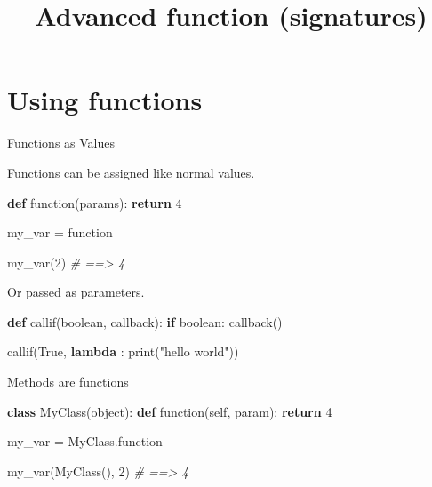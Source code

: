 \documentclass[ignorenonframetext,]{beamer}
\title{Advanced function (signatures)}
\date{}
\newenvironment{Shaded}{}{}
\newcommand{\KeywordTok}[1]{\textcolor[rgb]{0.00,0.44,0.13}{\textbf{{#1}}}}
\newcommand{\DataTypeTok}[1]{\textcolor[rgb]{0.56,0.13,0.00}{{#1}}}
\newcommand{\DecValTok}[1]{\textcolor[rgb]{0.25,0.63,0.44}{{#1}}}
\newcommand{\StringTok}[1]{\textcolor[rgb]{0.25,0.44,0.63}{{#1}}}
\newcommand{\CommentTok}[1]{\textcolor[rgb]{0.38,0.63,0.69}{\textit{{#1}}}}
\newcommand{\OtherTok}[1]{\textcolor[rgb]{0.00,0.44,0.13}{{#1}}}
\newcommand{\NormalTok}[1]{{#1}}
\begin{document}
\frame{\titlepage}

\section{Using functions}\label{using-functions}

\begin{frame}[fragile]{Functions as Values}

Functions can be assigned like normal values.

\begin{Shaded}
\begin{Highlighting}[]
\KeywordTok{def} \NormalTok{function(params):}
    \KeywordTok{return} \DecValTok{4}

\NormalTok{my_var = function}

\NormalTok{my_var(}\DecValTok{2}\NormalTok{)  }\CommentTok{# ==> 4}
\end{Highlighting}
\end{Shaded}

\end{frame}

\begin{frame}[fragile]

Or passed as parameters.

\begin{Shaded}
\begin{Highlighting}[]
\KeywordTok{def} \NormalTok{callif(boolean, callback):}
    \KeywordTok{if} \NormalTok{boolean:}
        \NormalTok{callback()}

\NormalTok{callif(}\OtherTok{True}\NormalTok{, }\KeywordTok{lambda} \NormalTok{: }\DataTypeTok{print}\NormalTok{(}\StringTok{"hello world"}\NormalTok{))}
\end{Highlighting}
\end{Shaded}

\end{frame}

\begin{frame}[fragile]{Methods are functions}

\begin{Shaded}
\begin{Highlighting}[]
\KeywordTok{class} \NormalTok{MyClass(}\DataTypeTok{object}\NormalTok{):}
    \KeywordTok{def} \NormalTok{function(}\OtherTok{self}\NormalTok{, param):}
        \KeywordTok{return} \DecValTok{4}


\NormalTok{my_var = MyClass.function}

\NormalTok{my_var(MyClass(), }\DecValTok{2}\NormalTok{)  }\CommentTok{# ==> 4}
\end{Highlighting}
\end{Shaded}

\end{frame}
\end{document}
